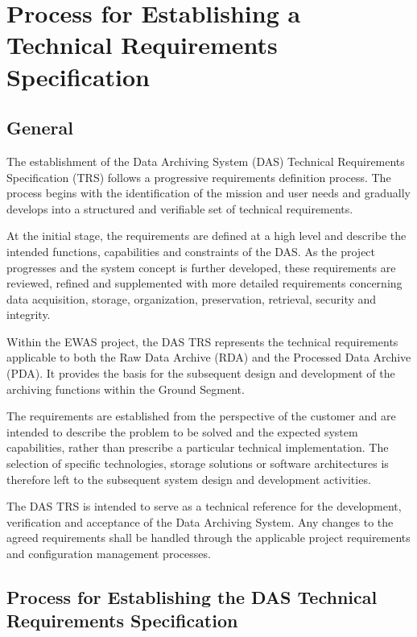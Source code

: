 \section{Process for Establishing a Technical Requirements Specification}

\subsection{General}

The establishment of the Data Archiving System (DAS) Technical Requirements Specification (TRS) follows a progressive requirements definition process. The process begins with the identification of the mission and user needs and gradually develops into a structured and verifiable set of technical requirements.

At the initial stage, the requirements are defined at a high level and describe the intended functions, capabilities and constraints of the DAS. As the project progresses and the system concept is further developed, these requirements are reviewed, refined and supplemented with more detailed requirements concerning data acquisition, storage, organization, preservation, retrieval, security and integrity.

Within the EWAS project, the DAS TRS represents the technical requirements applicable to both the Raw Data Archive (RDA) and the Processed Data Archive (PDA). It provides the basis for the subsequent design and development of the archiving functions within the Ground Segment.

The requirements are established from the perspective of the customer and are intended to describe the problem to be solved and the expected system capabilities, rather than prescribe a particular technical implementation. The selection of specific technologies, storage solutions or software architectures is therefore left to the subsequent system design and development activities.

The DAS TRS is intended to serve as a technical reference for the development, verification and acceptance of the Data Archiving System. Any changes to the agreed requirements shall be handled through the applicable project requirements and configuration management processes.

\subsection{Process for Establishing the DAS Technical Requirements Specification}

